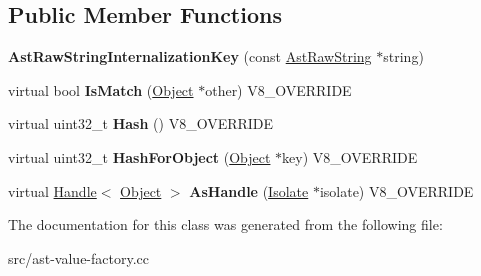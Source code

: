 \subsection*{Public Member Functions}
\begin{DoxyCompactItemize}
\item 
\hypertarget{classv8_1_1internal_1_1_ast_raw_string_internalization_key_af3086b894b997d1556f3501bcca631e1}{}{\bfseries Ast\+Raw\+String\+Internalization\+Key} (const \hyperlink{classv8_1_1internal_1_1_ast_raw_string}{Ast\+Raw\+String} $\ast$string)\label{classv8_1_1internal_1_1_ast_raw_string_internalization_key_af3086b894b997d1556f3501bcca631e1}

\item 
\hypertarget{classv8_1_1internal_1_1_ast_raw_string_internalization_key_ad8778f490117aefc02fcc966d34a82e7}{}virtual bool {\bfseries Is\+Match} (\hyperlink{classv8_1_1internal_1_1_object}{Object} $\ast$other) V8\+\_\+\+O\+V\+E\+R\+R\+I\+D\+E\label{classv8_1_1internal_1_1_ast_raw_string_internalization_key_ad8778f490117aefc02fcc966d34a82e7}

\item 
\hypertarget{classv8_1_1internal_1_1_ast_raw_string_internalization_key_af334b41b8220d50499b971f620606d25}{}virtual uint32\+\_\+t {\bfseries Hash} () V8\+\_\+\+O\+V\+E\+R\+R\+I\+D\+E\label{classv8_1_1internal_1_1_ast_raw_string_internalization_key_af334b41b8220d50499b971f620606d25}

\item 
\hypertarget{classv8_1_1internal_1_1_ast_raw_string_internalization_key_a468578799c232d5217bc63ba361b38a5}{}virtual uint32\+\_\+t {\bfseries Hash\+For\+Object} (\hyperlink{classv8_1_1internal_1_1_object}{Object} $\ast$key) V8\+\_\+\+O\+V\+E\+R\+R\+I\+D\+E\label{classv8_1_1internal_1_1_ast_raw_string_internalization_key_a468578799c232d5217bc63ba361b38a5}

\item 
\hypertarget{classv8_1_1internal_1_1_ast_raw_string_internalization_key_ac25b4acc4ef92b04de543aced3d31cda}{}virtual \hyperlink{classv8_1_1internal_1_1_handle}{Handle}$<$ \hyperlink{classv8_1_1internal_1_1_object}{Object} $>$ {\bfseries As\+Handle} (\hyperlink{classv8_1_1internal_1_1_isolate}{Isolate} $\ast$isolate) V8\+\_\+\+O\+V\+E\+R\+R\+I\+D\+E\label{classv8_1_1internal_1_1_ast_raw_string_internalization_key_ac25b4acc4ef92b04de543aced3d31cda}

\end{DoxyCompactItemize}


The documentation for this class was generated from the following file\+:\begin{DoxyCompactItemize}
\item 
src/ast-\/value-\/factory.\+cc\end{DoxyCompactItemize}
